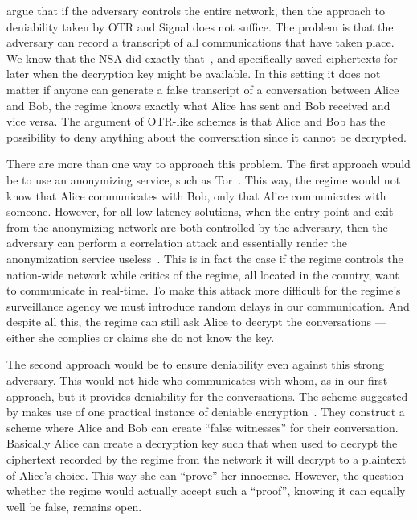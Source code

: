 \citet{OTPKX} argue that if the adversary controls the entire network, then the
approach to deniability taken by \ac{OTR} and Signal does not suffice.
The problem is that the adversary can record a transcript of all communications
that have taken place.
We know that the \ac{NSA} did exactly that~\cite{XKeyscore}, and specifically 
saved ciphertexts for later when the decryption key might be available.
In this setting it does not matter if anyone can generate a false transcript of
a conversation between Alice and Bob, the regime knows exactly what Alice has 
sent and Bob received and vice versa.
The argument of \ac{OTR}-like schemes is that Alice and Bob has the possibility 
to deny anything about the conversation since it cannot be decrypted.

There are more than one way to approach this problem.
The first approach would be to use an anonymizing service, such as 
Tor~\cite{Tor}.
This way, the regime would not know that Alice communicates with Bob, only that
Alice communicates with someone.
However, for all low-latency solutions, when the entry point and exit from the 
anonymizing network are both controlled by the adversary, then the adversary 
can perform a correlation attack and essentially render the anonymization 
service useless~\cite{SystemsForAnonymousCommunication}.
This is in fact the case if the regime controls the nation-wide network while 
critics of the regime, all located in the country, want to communicate in 
real-time.
To make this attack more difficult for the regime's surveillance agency we must 
introduce random delays in our communication.
And despite all this, the regime can still ask Alice to decrypt the 
conversations --- either she complies or claims she do not know the key.

The second approach would be to ensure deniability even against this strong 
adversary.
This would not hide who communicates with whom, as in our first approach, but 
it provides deniability for the conversations.
The scheme suggested by \citet{OTPKX} makes use of one practical instance of 
deniable encryption~\cite{DeniableEncryption}.
They construct a scheme where Alice and Bob can create \enquote{false 
witnesses} for their conversation.
Basically Alice can create a decryption key such that when used to decrypt the 
ciphertext recorded by the regime from the network it will decrypt to 
a plaintext of Alice's choice.
This way she can \enquote{prove} her innocense.
However, the question whether the regime would actually accept such 
a \enquote{proof}, knowing it can equally well be false, remains open.

